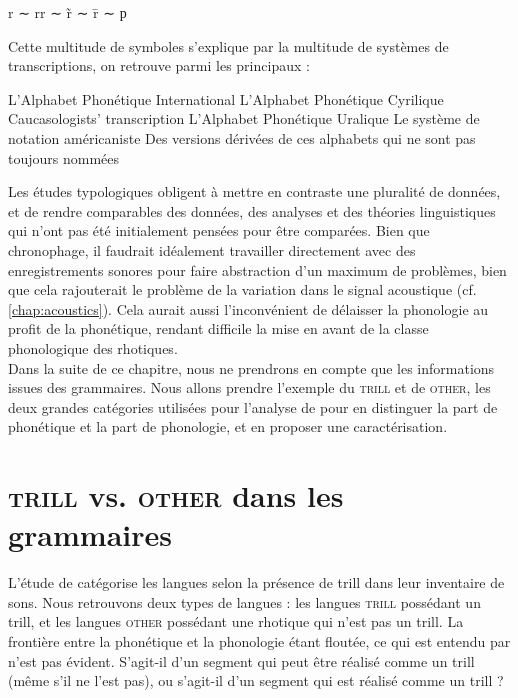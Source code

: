 \begin{exe}
	\ex r ∼ rr ∼ r̃ ∼ r̄ ∼ р
\end{exe}

Cette multitude de symboles s'explique par la multitude de systèmes de transcriptions, on retrouve parmi les principaux : 

\begin{exe}
	\ex \begin{xlist}
	\ex L'Alphabet Phonétique International
	\ex L'Alphabet Phonétique Cyrilique
	\ex Caucasologists' transcription
	\ex L'Alphabet Phonétique Uralique 
	\ex Le système de notation américaniste
	\ex Des versions dérivées de ces alphabets qui ne sont pas toujours nommées
	\end{xlist}
\end{exe}

Les études typologiques obligent à mettre en contraste une pluralité de données, et de rendre comparables des données, des analyses et des théories linguistiques qui n'ont pas été initialement pensées pour être comparées. Bien que chronophage, il faudrait idéalement travailler directement avec des enregistrements sonores pour faire abstraction d'un maximum de problèmes, bien que cela rajouterait le problème de la variation dans le signal acoustique (cf. \autoref{chap:acoustics}). Cela aurait aussi l'inconvénient de délaisser la phonologie au profit de la phonétique, rendant difficile la mise en avant de la classe phonologique des rhotiques.\\

Dans la suite de ce chapitre, nous ne prendrons en compte que les informations issues des grammaires.
Nous allons prendre l'exemple du \textsc{trill} et de \textsc{other}, les deux grandes catégories utilisées pour l'analyse de \textcite{winterTrilledAssociatedRoughness2022} pour en distinguer la part de phonétique et la part de phonologie, et en proposer une caractérisation.

\section{\textsc{trill} vs. \textsc{other} dans les grammaires}


L'étude de \textcite{winterTrilledAssociatedRoughness2022} catégorise les langues selon la présence de trill dans leur inventaire de sons. Nous retrouvons deux types de langues : les langues \textsc{trill} possédant un trill, et les langues \textsc{other} possédant une rhotique qui n'est pas un trill.
La frontière entre la phonétique et la phonologie étant floutée, ce qui est entendu par  n'est pas évident. S'agit-il d'un segment qui peut être réalisé comme un trill (même s'il ne l'est pas), ou s'agit-il d'un segment qui est réalisé comme un trill ?\\

